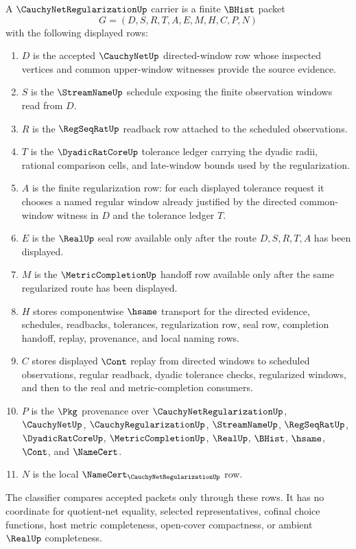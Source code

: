 \begin{definition}
\label{def:cauchy-net-regularization-carrier}
A $\CauchyNetRegularizationUp$ carrier is a finite $\BHist$ packet
$$
G=(D,S,R,T,A,E,M,H,C,P,N)
$$
with the following displayed rows:
\begin{enumerate}
\item $D$ is the accepted $\CauchyNetUp$ directed-window row whose inspected vertices and common upper-window witnesses provide the source evidence.
\item $S$ is the $\StreamNameUp$ schedule exposing the finite observation windows read from $D$.
\item $R$ is the $\RegSeqRatUp$ readback row attached to the scheduled observations.
\item $T$ is the $\DyadicRatCoreUp$ tolerance ledger carrying the dyadic radii, rational comparison cells, and late-window bounds used by the regularization.
\item $A$ is the finite regularization row: for each displayed tolerance request it chooses a named regular window already justified by the directed common-window witness in $D$ and the tolerance ledger $T$.
\item $E$ is the $\RealUp$ seal row available only after the route $D,S,R,T,A$ has been displayed.
\item $M$ is the $\MetricCompletionUp$ handoff row available only after the same regularized route has been displayed.
\item $H$ stores componentwise $\hsame$ transport for the directed evidence, schedules, readbacks, tolerances, regularization row, seal row, completion handoff, replay, provenance, and local naming rows.
\item $C$ stores displayed $\Cont$ replay from directed windows to scheduled observations, regular readback, dyadic tolerance checks, regularized windows, and then to the real and metric-completion consumers.
\item $P$ is the $\Pkg$ provenance over $\CauchyNetRegularizationUp$, $\CauchyNetUp$, $\CauchyRegularizationUp$, $\StreamNameUp$, $\RegSeqRatUp$, $\DyadicRatCoreUp$, $\MetricCompletionUp$, $\RealUp$, $\BHist$, $\hsame$, $\Cont$, and $\NameCert$.
\item $N$ is the local $\NameCert_{\CauchyNetRegularizationUp}$ row.
\end{enumerate}
The classifier compares accepted packets only through these rows. It has no coordinate for quotient-net equality, selected representatives, cofinal choice functions, host metric completeness, open-cover compactness, or ambient $\RealUp$ completeness.
\end{definition}

